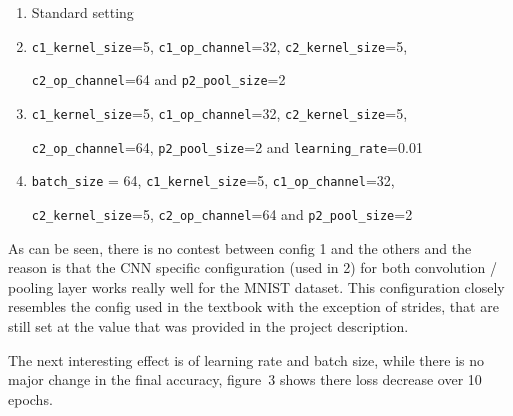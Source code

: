 \documentclass[12pt]{article}
\begin{document}
\begin{enumerate}
\item Standard setting
\item \texttt{c1\_kernel\_size}=5, \texttt{c1\_op\_channel}=32, \texttt{c2\_kernel\_size}=5, 

\texttt{c2\_op\_channel}=64 and \texttt{p2\_pool\_size}=2
\item \texttt{c1\_kernel\_size}=5, \texttt{c1\_op\_channel}=32, \texttt{c2\_kernel\_size}=5, 

\texttt{c2\_op\_channel}=64, \texttt{p2\_pool\_size}=2 and \texttt{learning\_rate}=0.01
\item \texttt{batch\_size} = 64, \texttt{c1\_kernel\_size}=5, \texttt{c1\_op\_channel}=32, 

\texttt{c2\_kernel\_size}=5, \texttt{c2\_op\_channel}=64 and \texttt{p2\_pool\_size}=2
\end{enumerate}

As can be seen, there is no contest between config 1 and the others and the reason is that the CNN specific configuration (used in 2) for both convolution / pooling layer works really well for the MNIST dataset. This configuration closely resembles the config used in the textbook with the exception of strides, that are still set at the value that was provided in the project description.

The next interesting effect is of learning rate and batch size, while there is no major change in the final accuracy, figure~3 shows there loss decrease over 10 epochs.
\end{document}
